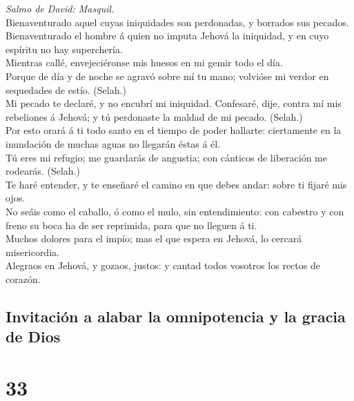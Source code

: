  \emph{Salmo de David: Masquil.}\\
Bienaventurado aquel cuyas iniquidades son perdonadas, y borrados sus
pecados.\\
 Bienaventurado el hombre á quien no imputa Jehová la
iniquidad, y en cuyo espíritu no hay superchería.\\
 Mientras callé, envejeciéronse mis huesos en mi gemir todo
el día.\\
 Porque de día y de noche se agravó sobre mí tu mano;
volvióse mi verdor en sequedades de estío. (Selah.)\\
 Mi pecado te declaré, y no encubrí mi iniquidad. Confesaré,
dije, contra mí mis rebeliones á Jehová; y tú perdonaste la maldad de mi
pecado. (Selah.)\\
 Por esto orará á ti todo santo en el tiempo de poder
hallarte: ciertamente en la inundación de muchas aguas no llegarán éstas
á él.\\
 Tú eres mi refugio; me guardarás de angustia; con cánticos
de liberación me rodearás. (Selah.)\\
 Te haré entender, y te enseñaré el camino en que debes
andar: sobre ti fijaré mis ojos.\\
 No seáis como el caballo, ó como el mulo, sin
entendimiento: con cabestro y con freno su boca ha de ser reprimida,
para que no lleguen á ti.\\
 Muchos dolores para el impío; mas el que espera en Jehová,
lo cercará misericordia.\\
 Alegraos en Jehová, y gozaos, justos: y cantad todos
vosotros los rectos de corazón.

\hypertarget{invitaciuxf3n-a-alabar-la-omnipotencia-y-la-gracia-de-dios}{%
\subsection{Invitación a alabar la omnipotencia y la gracia de
Dios}\label{invitaciuxf3n-a-alabar-la-omnipotencia-y-la-gracia-de-dios}}

\hypertarget{section-32}{%
\section{33}\label{section-32}}

